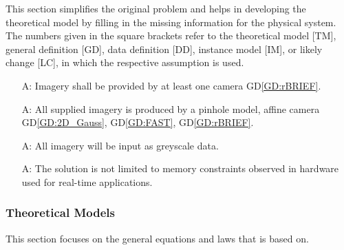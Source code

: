 \documentclass[12pt]{article}
\newcommand{\dref}[1]{GD\ref{#1}}
\newcounter{assumpnum} %
\begin{document}
This section simplifies the original problem and helps in developing the
theoretical model by filling in the missing information for the physical system.
The numbers given in the square brackets refer to the theoretical model [TM],
general definition [GD], data definition [DD], instance model [IM], or likely
change [LC], in which the respective assumption is used.

\begin{itemize}
\item[A\refstepcounter{assumpnum}\theassumpnum \label{A:min_num_cameras}:]
Imagery shall be provided by at least one camera \dref{GD:rBRIEF}.

\item[A\refstepcounter{assumpnum}\theassumpnum \label{A:camera_model}:]
All supplied imagery is produced by a pinhole model, affine camera 
\dref{GD:2D_Gauss}, \dref{GD:FAST}, \dref{GD:rBRIEF}.

\item[A\refstepcounter{assumpnum}\theassumpnum \label{A:greyscale}:]
All imagery will be input as greyscale data.


\item[A\refstepcounter{assumpnum}\theassumpnum \label{A:RT_Memory}:]
The solution is not limited to memory constraints observed in hardware used for real-time 
applications.

\end{itemize}

\subsubsection{Theoretical Models}\label{sec_theoretical}



This section focuses on the general equations and laws that \progname{} is based
on.  
\end{document}
